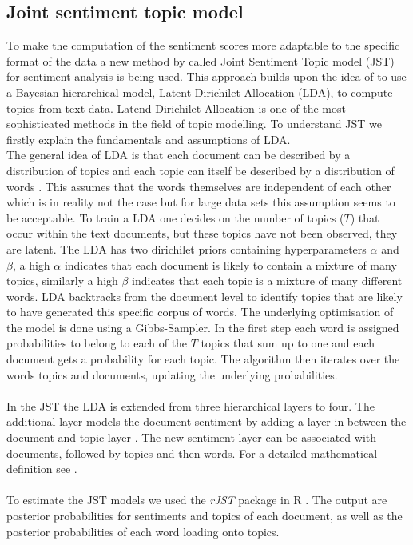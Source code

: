 \subsection{Joint sentiment topic model}\label{JST}
To make the computation of the sentiment scores more adaptable to the specific format of the data a new method by \citet{lin2009joint} called Joint Sentiment Topic model (JST) for sentiment analysis is being used. This approach builds upon the idea of \citet{blei2003latent} to use a Bayesian hierarchical model, Latent Dirichilet Allocation (LDA), to compute topics from text data. Latend Dirichilet Allocation is one of the most sophisticated methods in the field of topic modelling. To understand JST we firstly explain the fundamentals and assumptions of LDA. \\ 

The general idea of LDA is that each document can be described by a distribution of topics and each topic can itself be described by a distribution of words \citep{blei2003latent}. This assumes that the words themselves are independent of each other which is in reality not the case but for large data sets this assumption seems to be acceptable. To train a LDA one decides on the number of topics ($T$) that occur within the text documents, but these topics have not been observed, they are latent. The LDA has two dirichilet priors containing hyperparameters $\alpha$ and $\beta$, a high $\alpha$ indicates that each document is likely to contain a mixture of many topics, similarly a high $\beta$ indicates that each topic is a mixture of many different words. LDA backtracks from the document level to identify topics that are likely to have generated this specific corpus of words. The underlying optimisation of the model is done using a Gibbs-Sampler. In the first step each word is assigned probabilities to belong to each of the $T$ topics that sum up to one and each document gets a probability for each topic. The algorithm then iterates over the words topics and documents, updating the underlying probabilities. \\ \\
In the JST the LDA is extended from three hierarchical layers to four. The additional layer models the document sentiment by adding a layer in between the document and topic layer \citep{lin2009joint}. The new sentiment layer can be associated with documents, followed by topics and then words. For a detailed mathematical definition see \citet{lin2009joint}. \\ \\
To estimate the JST models we used the \textit{rJST} package in R \citep{rJST}. The output are posterior probabilities for sentiments and topics of each document, as well as the posterior probabilities of each word loading onto topics. 

